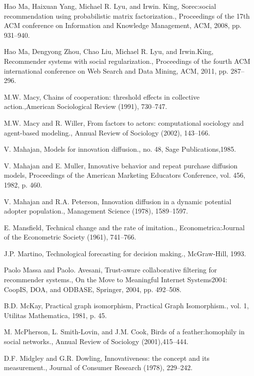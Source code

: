 \begin{thebibliography}{999}
 Hao Ma, Haixuan Yang, Michael R. Lyu, and Irwin. King, Sorec:social recommendation using probabilistic matrix factorization., Proceedings of the 17th ACM conference on Information and Knowledge Management, ACM, 2008, pp. 931–940.

 Hao Ma, Dengyong Zhou, Chao Liu, Michael R. Lyu, and Irwin.King, Recommender systems with social regularization., Proceedings of the fourth ACM international conference on Web Search and Data Mining, ACM, 2011, pp. 287–296.

 M.W. Macy, Chains of cooperation: threshold effects in collective action.,American Sociological Review (1991), 730–747.

 M.W. Macy and R. Willer, From factors to actors: computational sociology and agent-based modeling., Annual Review of Sociology (2002), 143–166.

 V. Mahajan, Models for innovation diffusion., no. 48, Sage Publications,1985.

 V. Mahajan and E. Muller, Innovative behavior and repeat purchase diffusion models, Proceedings of the American Marketing Educators Conference, vol. 456, 1982, p. 460.

 V. Mahajan and R.A. Peterson, Innovation diffusion in a dynamic potential adopter population., Management Science (1978), 1589–1597.

 E. Mansfield, Technical change and the rate of imitation., Econometrica:Journal of the Econometric Society (1961), 741–766.

 J.P. Martino, Technological forecasting for decision making., McGraw-Hill, 1993.

 Paolo Massa and Paolo. Avesani, Trust-aware collaborative filtering for recommender systems., On the Move to Meaningful Internet Systems2004: CoopIS, DOA, and ODBASE, Springer, 2004, pp. 492–508.

 B.D. McKay, Practical graph isomorphism, Practical Graph Isomorphism., vol. 1, Utilitas Mathematica, 1981, p. 45.

 M. McPherson, L. Smith-Lovin, and J.M. Cook, Birds of a feather:homophily in social networks., Annual Review of Sociology (2001),415–444.

 D.F. Midgley and G.R. Dowling, Innovativeness: the concept and its measurement., Journal of Consumer Research (1978), 229–242.


\end{thebibliography}

